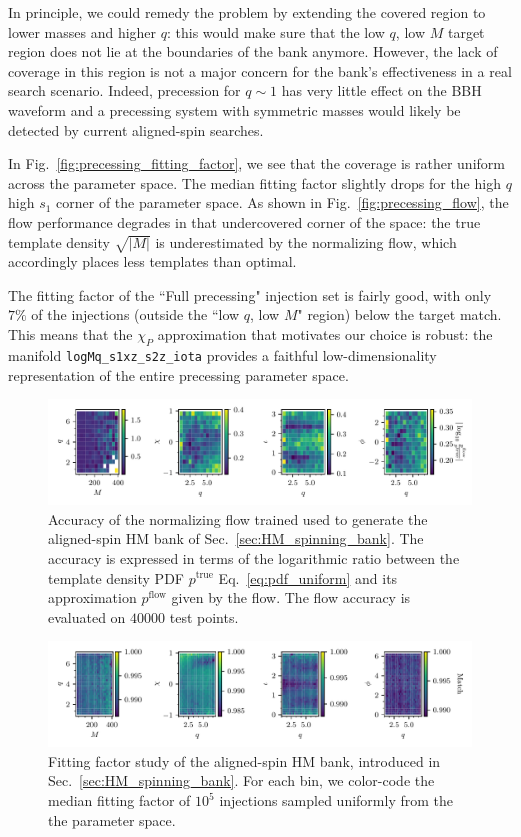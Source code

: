 \documentclass[twocolumn,showpacs,preprintnumbers,nofootinbib,prd,
superscriptaddress,10pt]{revtex4-2}
\begin{document}
In principle, we could remedy the problem by extending the covered region to lower masses and higher $q$: this would make sure that the low $q$, low $M$ target region does not lie at the boundaries of the bank anymore.
However, the lack of coverage in this region is not a major concern for the bank's effectiveness in a real search scenario. Indeed, precession for $q\sim 1$ has very little effect on the BBH waveform and a precessing system with symmetric masses would likely be detected by current aligned-spin searches.

In Fig.~\ref{fig:precessing_fitting_factor}, we see that the coverage is rather uniform across the parameter space. The median fitting factor slightly drops for the high $q$ high $s_1$ corner of the parameter space.
As shown in Fig.~\ref{fig:precessing_flow}, the flow performance degrades in that undercovered corner of the space: the true template density $\sqrt{|M|}$ is underestimated by the normalizing flow, which accordingly places less templates than optimal.

The fitting factor of the ``Full precessing" injection set is fairly good, with only $7\%$ of the injections (outside the ``low $q$, low $M$" region) below the target match. This means that the $\chi_P$ approximation that motivates our choice is robust: the manifold \texttt{logMq\_s1xz\_s2z\_iota} provides a faithful low-dimensionality representation of the entire precessing parameter space.

\begin{figure}[t]
	\includegraphics[scale = 1.]{HM_flow_accuracy}
	\caption{Accuracy of the normalizing flow trained used to generate the aligned-spin HM bank of Sec.~\ref{sec:HM_spinning_bank}. The accuracy is expressed in terms of the logarithmic ratio between the template density PDF $p^\text{true}$ Eq.~\eqref{eq:pdf_uniform} and its approximation $p^\text{flow}$ given by the flow. The flow accuracy is evaluated on $40000$ test points.}
	\label{fig:HM_flow}
\end{figure}

\begin{figure}[t]
	\includegraphics[scale = 1.]{HM_injections}
	\caption{Fitting factor study of the aligned-spin HM bank, introduced in Sec.~\ref{sec:HM_spinning_bank}. For each bin, we color-code the median fitting factor of $10^5$ injections sampled uniformly from the the parameter space.}
	\label{fig:HM_fitting_factor}
\end{figure}
\end{document}
